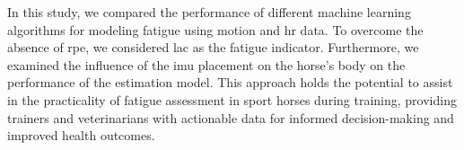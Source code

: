 In this study, we compared the performance of different machine learning algorithms for modeling fatigue using motion and \gls{hr} data. To overcome the absence of \gls{rpe}, we considered \gls{lac} as the fatigue indicator. Furthermore, we examined the influence of the \gls{imu} placement on the horse's body on the performance of the estimation model. This approach holds the potential to assist in the practicality of fatigue assessment in sport horses during training, providing trainers and veterinarians with actionable data for informed decision-making and improved health outcomes. 
